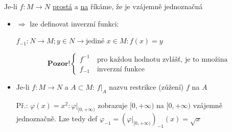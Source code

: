 \begin{definition}
    Je-li $f:M\rightarrow N$ \hyperref[D-injection]{prostá} a \hyperref[D-surjection]{na} říkáme, že je vzájemně jednoznačná
\end{definition}

\begin{itemize}
    \item 

        $\Rightarrow$ lze definovat inverzní funkci:
        
        $f_{-1}:N\rightarrow M; y\in N\rightarrow \text{jediné }x\in M: f(x)=y$

        \[
        \textbf{Pozor!}
        \begin{cases}
            f^{-1} \quad\text{pro každou hodnotu zvlášť, je to množina} \\
            f_{-1} \quad\text{inverzní funkce}
        \end{cases}
        \]
    \item Je-li $f:M\rightarrow N$ a $A\subset M$: $f|_A$ nazvu restrikce (zúžení) $f$ na $A$
        
        Př.: $\varphi(x)=x^2: \varphi|_{[0,+\infty)}$ zobrazuje $[0,+\infty)$ na $[0,+\infty)$
        vzájemně jednoznačně. Lze tedy def $\varphi_{-1}=(\varphi|_{[0,+\infty)})_{-1}(x)=\sqrt{x}$
\end{itemize}

\begin{definition}
    
\end{definition}